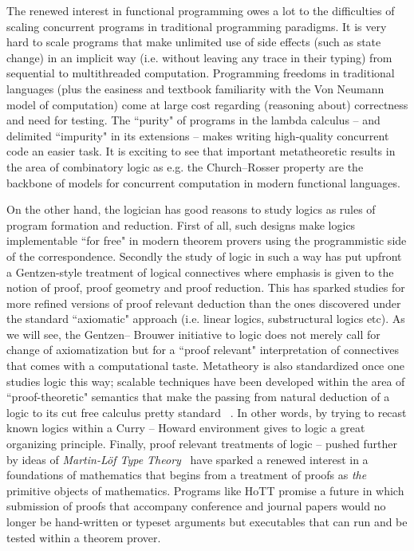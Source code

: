 The renewed interest in functional programming owes a lot to the difficulties of scaling concurrent programs in traditional programming paradigms. It is very hard  to scale programs that make unlimited use of side effects (such as state change) in an implicit way (i.e. without leaving any trace in their typing) from sequential to  multithreaded computation. Programming freedoms in traditional languages (plus the easiness and textbook familiarity with the Von Neumann model of computation) come at large cost regarding  (reasoning about) correctness and need for testing. The ``purity" of programs in the lambda calculus -- and delimited ``impurity" in its extensions -- makes writing high-quality concurrent code an easier task. It is exciting to see that important metatheoretic results in the area of combinatory logic as e.g. the Church--Rosser property are the backbone of models for concurrent computation in modern functional languages. 

On the other hand, the logician has good reasons to study logics as rules of program formation and reduction. First of all, such designs make logics implementable ``for free"
in modern theorem provers using the programmistic side of the correspondence. Secondly the study of logic in such a way has put upfront a  Gentzen-style treatment of logical connectives where emphasis is given to the notion of proof, proof geometry and proof reduction. This  has sparked studies for more refined versions of proof relevant deduction  than the ones discovered under the standard ``axiomatic" approach (i.e. linear logics, substructural logics etc). As we will see, the Gentzen-- Brouwer initiative to  logic  does not merely call for change of axiomatization but for a ``proof relevant" interpretation of connectives that comes with a computational taste. Metatheory is also standardized once one studies logic this way;  scalable techniques have been developed within the area of ``proof-theoretic" semantics that make the passing from  natural deduction of a logic to its cut free calculus pretty standard ~\cite{Sieg1998,pfenning2000structural}. In other words, by trying to recast known logics within a Curry -- Howard environment gives to logic a great organizing principle. Finally, proof relevant treatments of logic -- pushed further by ideas of \emph{Martin-L\"{o}f Type Theory}~\cite{martin1984intuitionistic} have sparked  a renewed interest in a foundations of mathematics that begins from a  treatment of proofs as \textit{the} primitive objects of mathematics. Programs like   \ac{HoTT} promise  a future in which submission of proofs that accompany conference and journal papers would no longer be hand-written or typeset arguments but executables that can run and be tested within a theorem prover.

